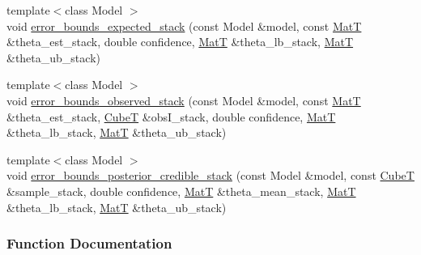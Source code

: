 \begin{DoxyCompactItemize}
{\footnotesize template$<$class Model $>$ }\\void \hyperlink{namespacemappel_1_1methods_1_1openmp_ac9aac4b2df768e850bee73aa5c7f2686}{error\+\_\+bounds\+\_\+expected\+\_\+stack} (const Model \&model, const \hyperlink{namespacemappel_a7091ab87c528041f7e2027195fad8915}{MatT} \&theta\+\_\+est\+\_\+stack, double confidence, \hyperlink{namespacemappel_a7091ab87c528041f7e2027195fad8915}{MatT} \&theta\+\_\+lb\+\_\+stack, \hyperlink{namespacemappel_a7091ab87c528041f7e2027195fad8915}{MatT} \&theta\+\_\+ub\+\_\+stack)
\item 
{\footnotesize template$<$class Model $>$ }\\void \hyperlink{namespacemappel_1_1methods_1_1openmp_a82a1f1d04ea0a21f003b35fad25a3442}{error\+\_\+bounds\+\_\+observed\+\_\+stack} (const Model \&model, const \hyperlink{namespacemappel_a7091ab87c528041f7e2027195fad8915}{MatT} \&theta\+\_\+est\+\_\+stack, \hyperlink{namespacemappel_ab2afab4e6c8805e83946670d882768c2}{CubeT} \&obs\+I\+\_\+stack, double confidence, \hyperlink{namespacemappel_a7091ab87c528041f7e2027195fad8915}{MatT} \&theta\+\_\+lb\+\_\+stack, \hyperlink{namespacemappel_a7091ab87c528041f7e2027195fad8915}{MatT} \&theta\+\_\+ub\+\_\+stack)
\item 
{\footnotesize template$<$class Model $>$ }\\void \hyperlink{namespacemappel_1_1methods_1_1openmp_a41b38e201ce475920203f52ac6557f80}{error\+\_\+bounds\+\_\+posterior\+\_\+credible\+\_\+stack} (const Model \&model, const \hyperlink{namespacemappel_ab2afab4e6c8805e83946670d882768c2}{CubeT} \&sample\+\_\+stack, double confidence, \hyperlink{namespacemappel_a7091ab87c528041f7e2027195fad8915}{MatT} \&theta\+\_\+mean\+\_\+stack, \hyperlink{namespacemappel_a7091ab87c528041f7e2027195fad8915}{MatT} \&theta\+\_\+lb\+\_\+stack, \hyperlink{namespacemappel_a7091ab87c528041f7e2027195fad8915}{MatT} \&theta\+\_\+ub\+\_\+stack)
\end{DoxyCompactItemize}


\subsubsection{Function Documentation}
